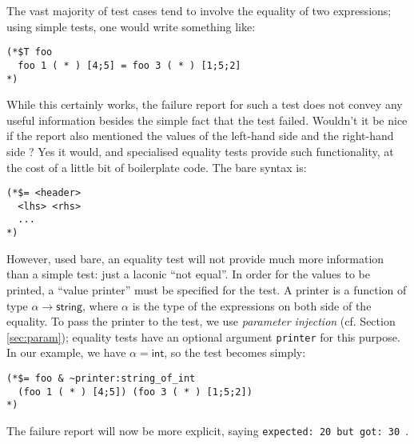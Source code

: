 
The vast majority of test cases tend to involve the equality of
two expressions; using simple tests, one would write something like:

\begin{verbatim}
(*$T foo
  foo 1 ( * ) [4;5] = foo 3 ( * ) [1;5;2]
*)
\end{verbatim} 

While this certainly works, the failure report for such a test does not convey
any useful information besides the simple fact that the test failed. Wouldn't it be
nice if the report also mentioned the values of the left-hand side and the
right-hand side ? Yes it would, and specialised equality tests provide such functionality,
at the cost of a little bit of boilerplate code. The bare syntax is:

\begin{verbatim}
(*$= <header>
  <lhs> <rhs>
  ...
*)
\end{verbatim}

However, used bare, an equality test will not provide much more information than a simple test:
just a laconic ``not equal''. In order for the values to be printed, a ``value printer''
must be specified for the test. A printer is a function of type $\alpha\to \textsf{string}$,
where $\alpha$ is the type of the expressions on both side of the equality.
To pass the printer to the test, we use \emph{parameter injection} (cf. Section \ref{sec:param});
equality tests have an optional argument \texttt{printer} for this purpose.
In our example, we have $\alpha = \textsf{int}$, so the test becomes simply:

\begin{verbatim}
(*$= foo & ~printer:string_of_int
  (foo 1 ( * ) [4;5]) (foo 3 ( * ) [1;5;2])
*)
\end{verbatim}

The failure report will now be more explicit, saying \texttt{expected: 20 but got: 30
}.

